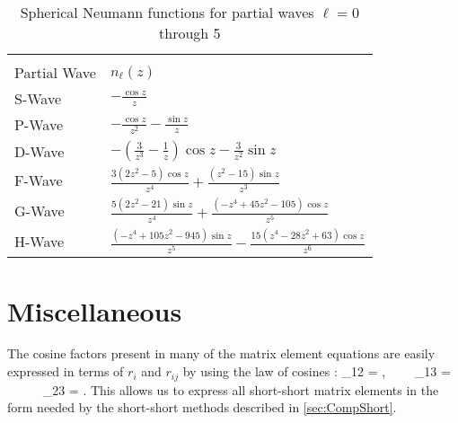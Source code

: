 \documentclass[Dissertation.tex]{subfiles}
\begin{document}
{
\renewcommand{\arraystretch}{1.5}
\begin{table}
\centering
\begin{tabular}{l l}
\toprule\\[-1.2cm]
Partial Wave & $n_\ell(z)$ \\
\midrule
S-Wave & $-\frac{\cos z}{z}$ \\
P-Wave & $-\frac{\cos z}{z^2} - \frac{\sin z}{z}$ \\
D-Wave & $-\left(\frac{3}{z^3}-\frac{1}{z}\right)\cos z - \frac{3}{z^2}\sin z$ \\
F-Wave & $\frac{3 \left(2 z^2-5\right) \cos z}{z^4}+\frac{\left(z^2-15\right) \sin z}{z^3}$ \\
G-Wave & $\frac{5 \left(2 z^2-21\right) \sin z}{z^4}+\frac{\left(-z^4+45 z^2-105\right) \cos z}{z^5}$ \\
H-Wave & $\frac{\left(-z^4+105 z^2-945\right) \sin z}{z^5}-\frac{15 \left(z^4-28 z^2+63\right) \cos z}{z^6}$ \\
\bottomrule
\end{tabular}
\caption{Spherical Neumann functions for partial waves $\ell = 0$ through 5}
\label{tab:SphNeum}
\end{table}
}




\section{Miscellaneous}
\label{sec:Misc}

The cosine factors present in many of the matrix element equations are easily 
expressed in terms of $r_i$ and $r_{ij}$ by using the law of cosines
\cite[p.174]{CRC1978}:
\beq
\label{eq:Cosines}
\cos\theta_{12} = , \ \ \ \ \cos\theta_{13} =  \ \ \   \ \ \cos\theta_{23} = .
\eeq
This allows us to express all short-short matrix elements in the form needed by
the short-short methods described in \cref{sec:CompShort}.



\biblio
\end{document}
